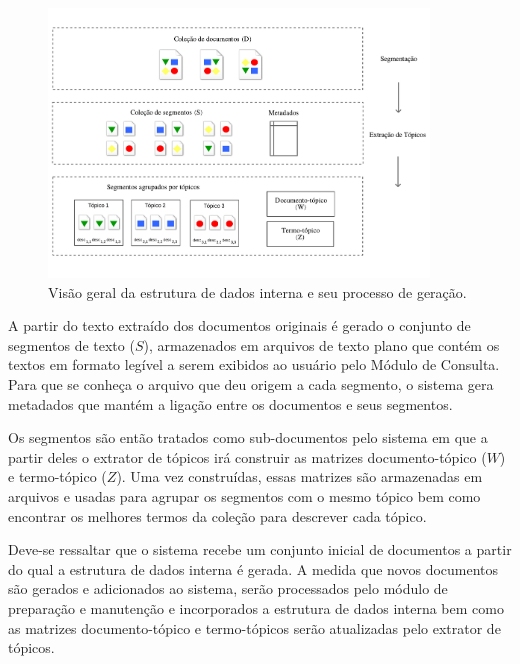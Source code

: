 


	\begin{figure}[h!]
\center
		\includegraphics[trim={ 0 40 0 40 },clip,page=1,width=0.9\textwidth]{conteudo/capitulos/figs/estrutura-de-dados-interna.pdf}

		\caption{Visão geral da estrutura de dados interna e seu processo de geração.}
		\label{fig:estrutura-dados-interna}
	\end{figure}




A partir do texto extraído dos documentos originais é gerado o conjunto de segmentos de texto ($S$), armazenados em arquivos de texto plano que contém os textos em formato legível a serem exibidos ao usuário pelo Módulo de Consulta. Para que se conheça o arquivo que deu origem a cada segmento, o sistema gera metadados que mantém a ligação entre os documentos e seus segmentos. 

Os segmentos são então tratados como sub-documentos pelo sistema em que a partir deles o extrator de tópicos irá construir as matrizes documento-tópico ($W$) e termo-tópico ($Z$). Uma vez construídas, essas matrizes são armazenadas em arquivos e usadas para agrupar os segmentos com o mesmo tópico bem como encontrar os melhores termos da coleção para descrever cada tópico.

Deve-se ressaltar que o sistema recebe um conjunto inicial de documentos a partir do qual a estrutura de dados interna é gerada. A medida que novos documentos são gerados e adicionados ao sistema, serão processados pelo módulo de preparação e manutenção e incorporados a estrutura de dados interna bem como as matrizes documento-tópico e termo-tópicos serão atualizadas pelo extrator de tópicos.




